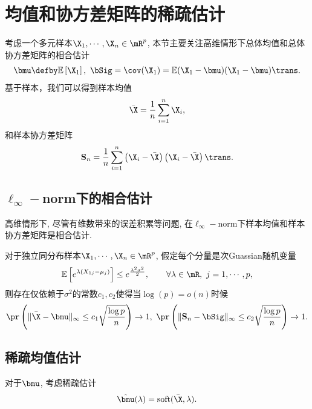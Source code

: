 \section{均值和协方差矩阵的稀疏估计}
考虑一个多元样本$\X_1,\cdots,\X_n \in \mR^p$, 本节主要关注高维情形下总体均值和总体协方差矩阵的相合估计
\begin{align*}
    \bmu\defby \E \left[ \X_1\right],~\bSig=\cov(\X_1)=\E(\X_1-\bmu)(\X_1-\bmu)\trans.
\end{align*}
基于样本，我们可以得到样本均值
\begin{align*}
  \bar{\X}=\frac{1}{n}\sum_{i=1}^n \X_i,
\end{align*}
和样本协方差矩阵
\begin{align*}
    \S_n=\frac{1}{n}\sum_{i=1}^n \left(\X_i-\bar{\X}\right)\left(\X_i-\bar{\X}\right)\trans.
\end{align*}

\subsection{$\ell_\infty-$norm下的相合估计}
高维情形下, 尽管有维数带来的误差积累等问题, 在$\ell_\infty-$norm下样本均值和样本协方差矩阵是相合估计.
\begin{prop}\label{max-norm}
    对于独立同分布样本$\X_1,\cdots,\X_n \in \mR^p$, 假定每个分量是次Guassian随机变量
    \begin{align*}
        \E\left[e^{\lambda (X_{1j}-\mu_j)}\right] \leq e^{\frac{\lambda^{2} \sigma^2}{2}}, \qquad \forall \lambda \in \mR,~j=1,\cdots,p,
    \end{align*}
   则存在仅依赖于$\sigma^2$的常数$c_1,c_2$使得当$\log(p)=o(n)$时候
   \begin{align*}
        \pr\left(\|\bar{\X}-\bmu\|_\infty \leq  c_1 \sqrt{\frac{\log p}{n}} \right) \to 1,~\pr\left(\|\S_n-\bSig\|_\infty \leq  c_2 \sqrt{\frac{\log p}{n}} \right) \to 1.
   \end{align*} 
\end{prop}

\subsection{稀疏均值估计}
对于$\bmu$, 考虑稀疏估计
\begin{align*}
	\hat{\bmu}(\lambda)=\soft(\bar{\X},\lambda).
\end{align*}


